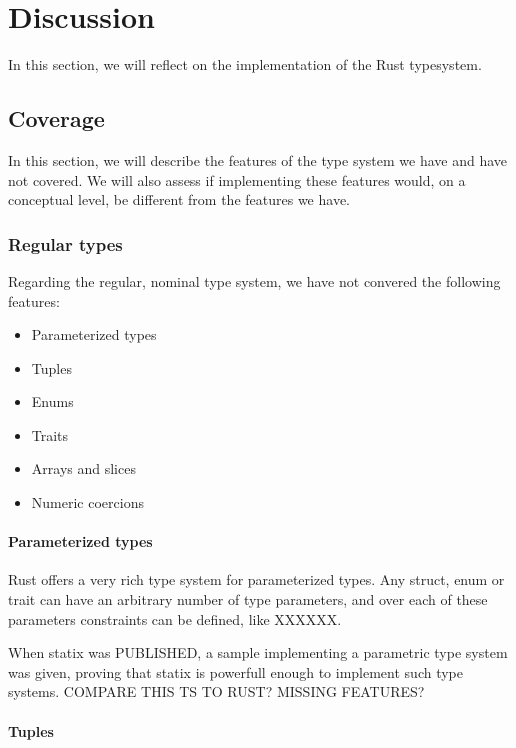 \section{Discussion}\label{s:discussion}


In this section, we will reflect on the implementation of the Rust typesystem.

\subsection{Coverage}

In this section, we will describe the features of the type system we have and have not covered. We will also assess if implementing these features would, on a conceptual level, be different from the features we have.

\subsubsection{Regular types}

Regarding the regular, nominal type system, we have not convered the following features:

\begin{itemize}
	\item Parameterized types
	\item Tuples
	\item Enums
	\item Traits
	\item Arrays and slices
	\item Numeric coercions
\end{itemize}

\paragraph{Parameterized types}

Rust offers a very rich type system for parameterized types. Any struct, enum or trait can have an arbitrary number of type parameters, and over each of these parameters constraints can be defined, like XXXXXX.

When statix was PUBLISHED, a sample implementing a parametric type system was given, proving that statix is powerfull enough to implement such type systems. COMPARE THIS TS TO RUST? MISSING FEATURES?

\paragraph{Tuples}

